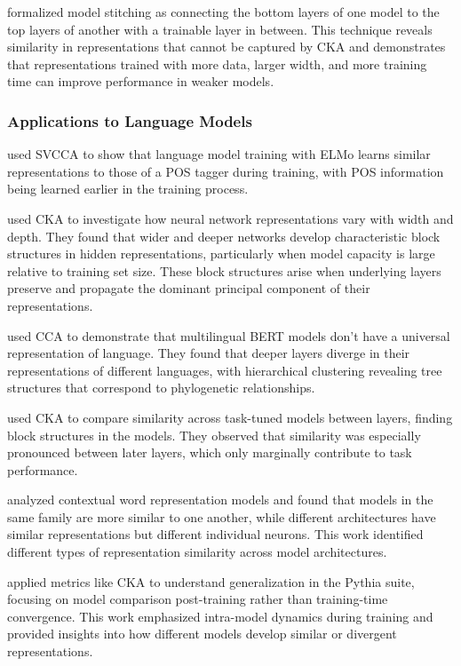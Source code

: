 \citet{bansal2021stitch} formalized model stitching as connecting the bottom layers of one model to the top layers of another with a trainable layer in between. This technique reveals similarity in representations that cannot be captured by CKA and demonstrates that representations trained with more data, larger width, and more training time can improve performance in weaker models.

\subsubsection{Applications to Language Models}

\citet{saphra2019understanding} used SVCCA to show that language model training with ELMo learns similar representations to those of a POS tagger during training, with POS information being learned earlier in the training process.

\citet{nguyen2020wide} used CKA to investigate how neural network representations vary with width and depth. They found that wider and deeper networks develop characteristic block structures in hidden representations, particularly when model capacity is large relative to training set size. These block structures arise when underlying layers preserve and propagate the dominant principal component of their representations.

\citet{singh2019bert} used CCA to demonstrate that multilingual BERT models don't have a universal representation of language. They found that deeper layers diverge in their representations of different languages, with hierarchical clustering revealing tree structures that correspond to phylogenetic relationships.

\citet{phang2021finetuned} used CKA to compare similarity across task-tuned models between layers, finding block structures in the models. They observed that similarity was especially pronounced between later layers, which only marginally contribute to task performance.

\citet{wu2020similarity} analyzed contextual word representation models and found that models in the same family are more similar to one another, while different architectures have similar representations but different individual neurons. This work identified different types of representation similarity across model architectures.

\citet{brown2023understanding} applied metrics like CKA to understand generalization in the Pythia suite, focusing on model comparison post-training rather than training-time convergence. This work emphasized intra-model dynamics during training and provided insights into how different models develop similar or divergent representations.


